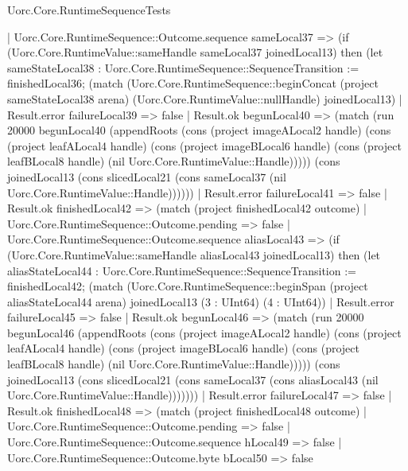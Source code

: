 \begin{lexlean}{Uorc.Core.RuntimeSequenceTests}
\begin{semanticmodule}
{                                  | Uorc.Core.RuntimeSequence::Outcome.sequence sameLocal37 => (if (Uorc.Core.RuntimeValue::sameHandle sameLocal37 joinedLocal13) then (let sameStateLocal38 : Uorc.Core.RuntimeSequence::SequenceTransition := finishedLocal36; (match (Uorc.Core.RuntimeSequence::beginConcat (project sameStateLocal38 arena) (Uorc.Core.RuntimeValue::nullHandle) joinedLocal13)
                                    | Result.error failureLocal39 => false
                                    | Result.ok begunLocal40 => (match (run 20000 begunLocal40 (appendRoots (cons (project imageALocal2 handle) (cons (project leafALocal4 handle) (cons (project imageBLocal6 handle) (cons (project leafBLocal8 handle) (nil Uorc.Core.RuntimeValue::Handle))))) (cons joinedLocal13 (cons slicedLocal21 (cons sameLocal37 (nil Uorc.Core.RuntimeValue::Handle))))))
                                      | Result.error failureLocal41 => false
                                      | Result.ok finishedLocal42 => (match (project finishedLocal42 outcome)
                                        | Uorc.Core.RuntimeSequence::Outcome.pending => false
                                        | Uorc.Core.RuntimeSequence::Outcome.sequence aliasLocal43 => (if (Uorc.Core.RuntimeValue::sameHandle aliasLocal43 joinedLocal13) then (let aliasStateLocal44 : Uorc.Core.RuntimeSequence::SequenceTransition := finishedLocal42; (match (Uorc.Core.RuntimeSequence::beginSpan (project aliasStateLocal44 arena) joinedLocal13 (3 : UInt64) (4 : UInt64))
                                          | Result.error failureLocal45 => false
                                          | Result.ok begunLocal46 => (match (run 20000 begunLocal46 (appendRoots (cons (project imageALocal2 handle) (cons (project leafALocal4 handle) (cons (project imageBLocal6 handle) (cons (project leafBLocal8 handle) (nil Uorc.Core.RuntimeValue::Handle))))) (cons joinedLocal13 (cons slicedLocal21 (cons sameLocal37 (cons aliasLocal43 (nil Uorc.Core.RuntimeValue::Handle)))))))
                                            | Result.error failureLocal47 => false
                                            | Result.ok finishedLocal48 => (match (project finishedLocal48 outcome)
                                              | Uorc.Core.RuntimeSequence::Outcome.pending => false
                                              | Uorc.Core.RuntimeSequence::Outcome.sequence hLocal49 => false
                                              | Uorc.Core.RuntimeSequence::Outcome.byte bLocal50 => false
}
\end{semanticmodule}
\end{lexlean}
